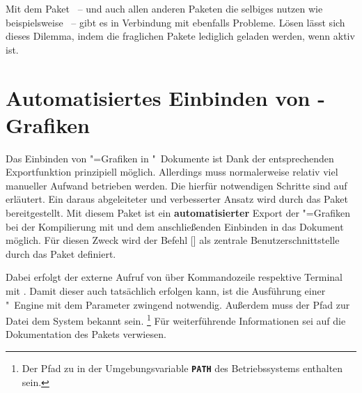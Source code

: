 
Mit dem Paket ~-- und auch allen anderen Paketen die 
selbiges nutzen wie beispielsweise ~-- gibt es in Verbindung 
mit  ebenfalls Probleme. Lösen lässt sich dieses Dilemma, 
indem die fraglichen Pakete lediglich geladen werden, wenn  
aktiv ist.
%
\begin{quoting}[rightmargin=0pt]
\begin{Code}
\ifpdf
  \usepackage{tikz}%
\fi
\end{Code}
\end{quoting}



\section{%
  Automatisiertes Einbinden von 
  -Grafiken%
  \label{sec:tips:svg}%
}

%
Das Einbinden von "=Grafiken in "~Dokumente
ist Dank der entsprechenden Exportfunktion prinzipiell möglich. Allerdings muss 
normalerweise relativ viel manueller Aufwand betrieben werden. Die hierfür 
notwendigen Schritte sind auf  erläutert. Ein daraus 
abgeleiteter und verbesserter Ansatz wird durch das Paket  
bereitgestellt. Mit diesem Paket ist ein \textbf{automatisierter} Export der 
"=Grafiken bei der Kompilierung mit  
und dem anschließenden Einbinden in das Dokument möglich. Für diesen Zweck wird 
der Befehl [] als 
zentrale Benutzerschnittstelle durch das Paket definiert.

Dabei erfolgt der externe Aufruf von  über Kommandozeile 
respektive Terminal mit . Damit dieser auch tatsächlich 
erfolgen kann, ist die Ausführung einer "~Engine mit dem 
Parameter  zwingend notwendig. Außerdem muss der Pfad 
zur Datei  dem System bekannt sein.%
\footnote{%
  Der Pfad zu  in der Umgebungsvariable 
  \textbf{\texttt{PATH}} des Betriebssystems enthalten sein.%
}
Für weiterführende Informationen sei auf die Dokumentation des Pakets 
 verwiesen.



